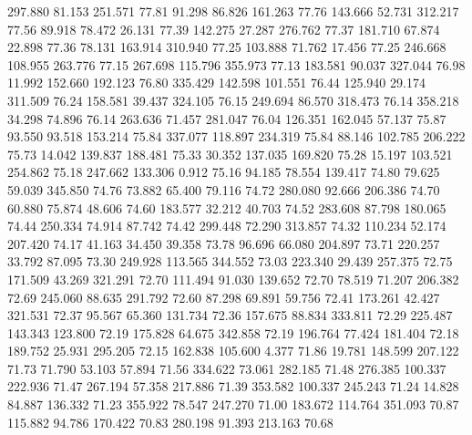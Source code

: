  297.880   81.153  251.571        77.81
  91.298   86.826  161.263        77.76
 143.666   52.731  312.217        77.56
  89.918   78.472   26.131        77.39
 142.275   27.287  276.762        77.37
 181.710   67.874   22.898        77.36
  78.131  163.914  310.940        77.25
 103.888   71.762   17.456        77.25
 246.668  108.955  263.776        77.15
 267.698  115.796  355.973        77.13
 183.581   90.037  327.044        76.98
  11.992  152.660  192.123        76.80
 335.429  142.598  101.551        76.44
 125.940   29.174  311.509        76.24
 158.581   39.437  324.105        76.15
 249.694   86.570  318.473        76.14
 358.218   34.298   74.896        76.14
 263.636   71.457  281.047        76.04
 126.351  162.045   57.137        75.87
  93.550   93.518  153.214        75.84
 337.077  118.897  234.319        75.84
  88.146  102.785  206.222        75.73
  14.042  139.837  188.481        75.33
  30.352  137.035  169.820        75.28
  15.197  103.521  254.862        75.18
 247.662  133.306    0.912        75.16
  94.185   78.554  139.417        74.80
  79.625   59.039  345.850        74.76
  73.882   65.400   79.116        74.72
 280.080   92.666  206.386        74.70
  60.880   75.874   48.606        74.60
 183.577   32.212   40.703        74.52
 283.608   87.798  180.065        74.44
 250.334   74.914   87.742        74.42
 299.448   72.290  313.857        74.32
 110.234   52.174  207.420        74.17
  41.163   34.450   39.358        73.78
  96.696   66.080  204.897        73.71
 220.257   33.792   87.095        73.30
 249.928  113.565  344.552        73.03
 223.340   29.439  257.375        72.75
 171.509   43.269  321.291        72.70
 111.494   91.030  139.652        72.70
  78.519   71.207  206.382        72.69
 245.060   88.635  291.792        72.60
  87.298   69.891   59.756        72.41
 173.261   42.427  321.531        72.37
  95.567   65.360  131.734        72.36
 157.675   88.834  333.811        72.29
 225.487  143.343  123.800        72.19
 175.828   64.675  342.858        72.19
 196.764   77.424  181.404        72.18
 189.752   25.931  295.205        72.15
 162.838  105.600    4.377        71.86
  19.781  148.599  207.122        71.73
  71.790   53.103   57.894        71.56
 334.622   73.061  282.185        71.48
 276.385  100.337  222.936        71.47
 267.194   57.358  217.886        71.39
 353.582  100.337  245.243        71.24
  14.828   84.887  136.332        71.23
 355.922   78.547  247.270        71.00
 183.672  114.764  351.093        70.87
 115.882   94.786  170.422        70.83
 280.198   91.393  213.163        70.68
